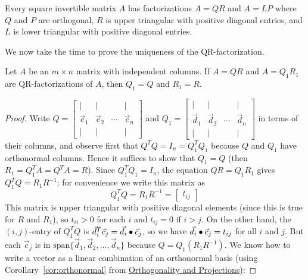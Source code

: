 \documentclass{ximera}
\begin{document}
\begin{theorem}\label{th:025166}
Every square invertible matrix $A$ has factorizations $A = QR$ and $A = LP$ where $Q$ and $P$ are orthogonal, $R$ is upper triangular with positive diagonal entries, and $L$ is lower triangular with positive diagonal entries.
\end{theorem}
    
We now take the time to prove the uniqueness of the QR-factorization.
    
\begin{theorem}\label{th:QR-unique-025187}
Let $A$ be an $m \times n$ matrix with independent columns. If $A = QR$ and $A = Q_{1}R_{1}$ are QR-factorizations of $A$, then $Q_{1} = Q$ and $R_{1} = R$.
\end{theorem}
    
\begin{proof}
Write $Q = \left[ \begin{array}{cccc}
|&|& &| \\
\vec{c}_{1} & \vec{c}_{2} & \cdots &  \vec{c}_{n}\\
|&|& &|
\end{array}\right]$  and $Q_{1} =  \left[ \begin{array}{cccc}
|&|& &| \\
\vec{d}_{1} & \vec{d}_{2} & \cdots &  \vec{d}_{n}\\
|&|& &|
\end{array}\right]$ in terms of their columns, and observe first that $Q^TQ = I_{n} = Q_{1}^TQ_{1}$ because $Q$ and $Q_{1}$ have orthonormal columns. Hence it suffices to show that $Q_{1} = Q$ (then $R_{1} = Q_{1}^TA = Q^TA = R$). Since $Q_{1}^TQ_{1} = I_{n}$, the equation $QR = Q_{1}R_{1}$ gives $Q_{1}^TQ = R_{1}R^{-1}$; for convenience we write this matrix as
\begin{equation*}
Q_{1}^TQ = R_{1}R^{-1} = \left[ \begin{array}{c} t_{ij} \end{array}\right]
\end{equation*}
This matrix is upper triangular with positive diagonal elements (since this is true for $R$ and $R_{1}$), so $t_{ii} > 0$ for each $i$ and $t_{ij} = 0$ if $i > j$. On the other hand, the $(i, j)$-entry of $Q_{1}^TQ$ is $\vec{d}_{i}^T\vec{c}_{j} = \vec{d}_{i} \bullet \vec{c}_{j}$, so we have $\vec{d}_{i} \bullet \vec{c}_{j} = t_{ij}$ for all $i$ and $j$. But each $\vec{c}_{j}$ is in $\mbox{span}\{\vec{d}_{1}, \vec{d}_{2}, \dots, \vec{d}_{n}\}$ because $Q = Q_{1}(R_{1}R^{-1})$. We know how to write a vector as a linear combination of an orthonormal basis (using Corollary~\ref{cor:orthonormal} from \href{https://ximera.osu.edu/oerlinalg/LinearAlgebra/RTH-0010/main}{Orthogonality and Projections}):

\end{proof}
\end{document}
